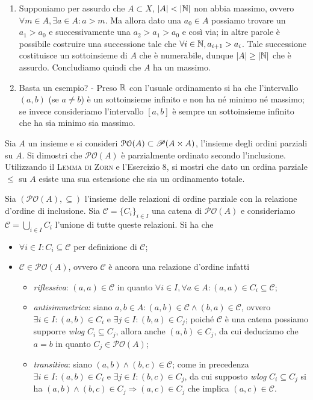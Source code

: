 \documentclass[a4paper]{article}\par \usepackage{style}\par
\begin{document}
\begin{enumerate}
\item Supponiamo per assurdo che $ A \subset X $, $ |A| < |\N| $ non abbia massimo, ovvero $ \forall m \in A, \exists a \in A : a > m $. Ma allora dato una $ a_0 \in A $ possiamo trovare un $ a_1 > a_0 $ e successivamente una $ a_2 > a_1 > a_0 $ e così via; in altre parole è possibile costruire una successione tale che $ \forall i \in \N, a_{i + 1} > a_i $. Tale successione costituisce un sottoinsieme di $ A $ che è numerabile, dunque $ |A| \geq |\N| $ che è assurdo. Concludiamo quindi che $ A $ ha un massimo.
\item \textsf{Basta un esempio? - Preso $ \R $ con l'usuale ordinamento si ha che l'intervallo $ (a, b) $ (se $ a \neq b $) è un sottoinsieme infinito e non ha né minimo né massimo; se invece consideriamo l'intervallo $ [a, b] $ è sempre un sottoinsieme infinito che ha sia minimo sia massimo.}
\end{enumerate}\par \begin{es}
  Sia $ A $ un insieme e si consideri $ \mathcal{PO}(A) \subset \P(A \times A) $, l'insieme degli ordini parziali su $ A $. Si dimostri che $ \mathcal{PO}(A) $ è parzialmente ordinato secondo l'inclusione. Utilizzando il \textsc{Lemma di Zorn} e l'Esercizio 8, si mostri che dato un ordina parziale $ \leq $ su $ A $ esiste una sua estensione che sia un ordinamento totale.
\end{es}
Sia $ (\mathcal{PO}(A), \subseteq) $ l'insieme delle relazioni di ordine parziale con la relazione d'ordine di inclusione. Sia $ \mathscr{C} = \{C_i\}_{i \in I} $ una catena di $ \mathcal{PO}(A) $ e consideriamo $ \mathcal{C} = \bigcup_{i \in I} C_i $ l'unione di tutte queste relazioni. Si ha che
\begin{itemize}
\item $ \forall i \in I : C_i \subseteq \mathcal{C} $ per definizione di $ \mathcal{C} $;
\item $ \mathcal{C} \in \mathcal{PO}(A) $, ovvero $ \mathcal{C} $ è ancora una relazione d'ordine infatti
  \begin{itemize}
  \item \emph{riflessiva}: $ (a, a) \in \mathcal{C} $ in quanto $ \forall i \in I, \forall a \in A : (a, a) \in C_i \subseteq \mathcal{C} $;
  \item \emph{antisimmetrica}: siano $ a, b \in A : (a, b) \in \mathcal{C} \wedge (b, a) \in \mathcal{C} $, ovvero $ \exists i \in I : (a, b) \in C_i $ e $ \exists j \in I : (b, a) \in C_j $; poiché $ \mathscr{C} $ è una catena possiamo supporre \emph{wlog} $ C_i \subseteq C_j $, allora anche $ (a, b) \in C_j $, da cui deduciamo che $ a = b $ in quanto $ C_j \in \mathcal{PO}(A) $;
  \item \emph{transitiva}: siano $ (a, b) \wedge (b, c) \in \mathcal{C} $; come in precedenza $ \exists i \in I : (a, b) \in C_i $ e $ \exists j \in I : (b, c) \in C_j $, da cui supposto \emph{wlog} $ C_i \subseteq C_j $ si ha $ (a, b) \wedge (b, c) \in C_j \Rightarrow (a, c) \in C_j $ che implica $ (a, c) \in \mathcal{C} $.
  \end{itemize}
\end{itemize}
\end{document}
